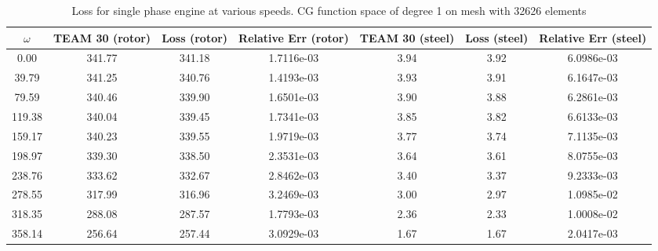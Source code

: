 \begin{table}[!ht]
\centering
\caption{Loss for single phase engine at various speeds. CG function space of degree 1 on mesh with 32626 elements}
\label{tab:loss:single}
\begin{tabular}{ccccccc}
\toprule
$\omega$ & TEAM 30 (rotor) & Loss (rotor) & Relative Err (rotor) & TEAM 30 (steel) & Loss (steel) & Relative Err (steel) \\
\midrule
    0.00 &          341.77 &       341.18 &           1.7116e-03 &            3.94 &         3.92 &           6.0986e-03 \\
   39.79 &          341.25 &       340.76 &           1.4193e-03 &            3.93 &         3.91 &           6.1647e-03 \\
   79.59 &          340.46 &       339.90 &           1.6501e-03 &            3.90 &         3.88 &           6.2861e-03 \\
  119.38 &          340.04 &       339.45 &           1.7341e-03 &            3.85 &         3.82 &           6.6133e-03 \\
  159.17 &          340.23 &       339.55 &           1.9719e-03 &            3.77 &         3.74 &           7.1135e-03 \\
  198.97 &          339.30 &       338.50 &           2.3531e-03 &            3.64 &         3.61 &           8.0755e-03 \\
  238.76 &          333.62 &       332.67 &           2.8462e-03 &            3.40 &         3.37 &           9.2333e-03 \\
  278.55 &          317.99 &       316.96 &           3.2469e-03 &            3.00 &         2.97 &           1.0985e-02 \\
  318.35 &          288.08 &       287.57 &           1.7793e-03 &            2.36 &         2.33 &           1.0008e-02 \\
  358.14 &          256.64 &       257.44 &           3.0929e-03 &            1.67 &         1.67 &           2.0417e-03 \\
\bottomrule
\end{tabular}
\end{table}


